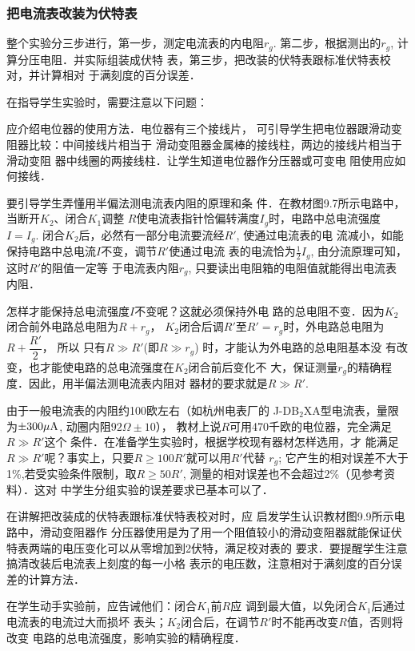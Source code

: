 \subsubsection{把电流表改装为伏特表}
整个实验分三步进行，第一步，测定电流表的内电阻$r_g$.
第二步，根据测出的$r_g$, 计算分压电阻．并实际组装成伏特
表，第三步，把改装的伏特表跟标准伏特表校对，并计算相对
于满刻度的百分误差．

在指导学生实验时，需要注意以下问题：

应介绍电位器的使用方法．电位器有三个接线片，
可引导学生把电位器跟滑动变阻器比较：中间接线片相当于
滑动变阻器金属棒的接线柱，两边的接线片相当于滑动变阻
器中线圈的两接线柱．让学生知道电位器作分压器或可变电
阻使用应如何接线．

要引导学生弄懂用半偏法测电流表内阻的原理和条
件．在教材图9.7所示电路中，当断开$K_2$、闭合$K_1$调整
$R$使电流表指针恰偏转满度$I_g$时，电路中总电流强度$I=I_g$.
闭合$K_2$后，必然有一部分电流要流经$R'$, 使通过电流表的电
流减小，如能保持电路中总电流$I$不变，调节$R'$使通过电流
表的电流恰为$\frac{1}{2}I_g$, 由分流原理可知，这时$R'$的阻值一定等
于电流表内阻$r_g$, 只要读出电阻箱的电阻值就能得出电流表
内阻．

怎样才能保持总电流强度$I$不变呢？这就必须保持外电
路的总电阻不变．因为$K_2$闭合前外电路总电阻为$R+r_g$，
$K_2$闭合后调$R'$至$R'=r_g$时，外电路总电阻为$R+\dfrac{R'}{2}$，
所以
只有$R\gg R'$(即$R\gg r_g$) 时，才能认为外电路的总电阻基本没
有改变，也才能使电路的总电流强度在$K_2$闭合前后变化不
大，保证测量$r_g$的精确程度．因此，用半偏法测电流表内阻对
器材的要求就是$R\gg R'$.

由于一般电流表的内阻约100欧左右（如杭州电表厂的
J-DB$_2$XA型电流表，量限为$\pm300\mu {\rm A}$, 动圈内阻$92{\Omega}\pm 10$），
教材上说$R$可用470千欧的电位器，完全满足$R\gg R'$这个
条件．在准备学生实验时，根据学校现有器材怎样选用，才
能满足$R\gg R'$呢？事实上，只要$R\ge 100R'$就可以用$R'$代替
$r_g$; 它产生的相对误差不大于1\%,若受实验条件限制，取$R\ge 
50R'$, 测量的相对误差也不会超过2\%（见参考资料）．这对
中学生分组实验的误差要求已基本可以了．

在讲解把改装成的伏特表跟标准伏特表校对时，应
启发学生认识教材图9.9所示电路中，滑动变阻器作
分压器使用是为了用一个阻值较小的滑动变阻器就能保证伏
特表两端的电压变化可以从零增加到2伏特，满足校对表的
要求．要提醒学生注意搞清改装后电流表上刻度的每一小格
表示的电压数，注意相对于满刻度的百分误差的计算方法．

在学生动手实验前，应告诫他们：闭合$K_1$前$R$应
调到最大值，以免闭合$K_1$后通过电流表的电流过大而损坏
表头；$K_2$闭合后，在调节$R'$时不能再改变$R$值，否则将改变
电路的总电流强度，影响实验的精确程度．

